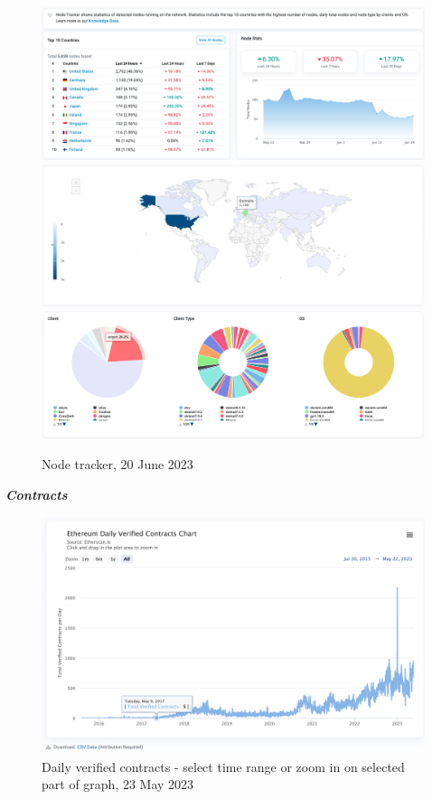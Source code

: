 \documentclass[UTF8]{article}
\begin{document}
{\begin{figure}[htbp]
\begin{center}
\includegraphics[width=0.9\linewidth]{images/nodetrk1} \\
\includegraphics[width=0.9\linewidth]{images/nodetrk2} \\
\includegraphics[width=0.9\linewidth]{images/nodetrk3}
\caption{Node tracker, 20 June 2023}
\label{fig:nodetrk}
\end{center}
\end{figure}

\clearpage

\textit{\textbf{Contracts}}
\begin{figure}[htbp]
\begin{center}
\includegraphics[width=0.9\linewidth]{images/dailyverified}
\caption{Daily verified contracts - select time range or zoom in on selected part of graph, 23 May 2023}
\label{fig:dailyverified}
\end{center}
\end{figure}


}
\end{document}
